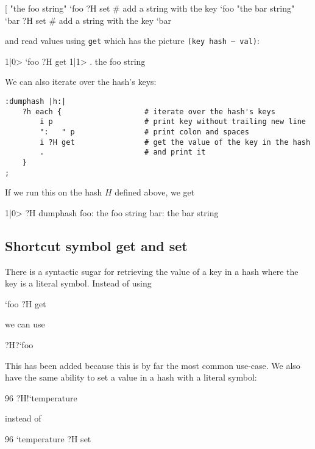 \begin{v}
[%
"the foo string" `foo ?H set    # add a string with the key `foo
"the bar string" `bar ?H set    # add a string with the key `bar
\end{v}
and read values using \texttt{get} which has the picture \texttt{(key hash -- val)}:
\begin{v}
1|0> `foo ?H get
1|1> .
the foo string
\end{v}
We can also iterate over the hash's keys:
\begin{lstlisting}
:dumphash |h:|
    ?h each {                   # iterate over the hash's keys
        i p                     # print key without trailing new line
        ":   " p                # print colon and spaces
        i ?H get                # get the value of the key in the hash
        .                       # and print it
    }
;
\end{lstlisting}
If we run this on the hash $H$ defined above, we get
\begin{v}
1|0> ?H dumphash
foo:   the foo string
bar:   the bar string
\end{v}

\subsection{Shortcut symbol get and set}
There is a syntactic sugar for retrieving the value of a key in
a hash where the key is a literal symbol. Instead of using
\begin{v}
`foo ?H get
\end{v}
we can use
\begin{v}
?H?`foo
\end{v}
This has been added because this is by far the most common use-case.
We also have the same ability to set a value in a hash with a literal
symbol:
\begin{v}
96 ?H!`temperature
\end{v}
instead of
\begin{v}
96 `temperature ?H set
\end{v}

